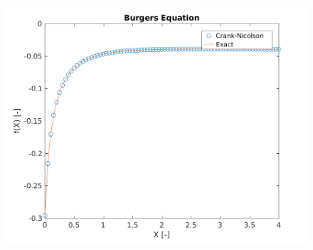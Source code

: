 \documentclass[12pt]{article}
\begin{document}
	\begin{figure}[!htb]
		\centering
		\includegraphics[scale=0.75]{problem2_CN.png}
	\end{figure}





		
	
	
	
	
\end{document}
